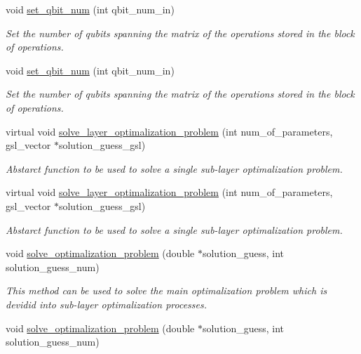 \begin{DoxyCompactItemize}
void \hyperlink{class_operation__block_acc41ac933723558df3f4e65ae1158091}{set\+\_\+qbit\+\_\+num} (int qbit\+\_\+num\+\_\+in)
\begin{DoxyCompactList}\small\item\em Set the number of qubits spanning the matrix of the operations stored in the block of operations. \end{DoxyCompactList}\item 
void \hyperlink{class_operation__block_acc41ac933723558df3f4e65ae1158091}{set\+\_\+qbit\+\_\+num} (int qbit\+\_\+num\+\_\+in)
\begin{DoxyCompactList}\small\item\em Set the number of qubits spanning the matrix of the operations stored in the block of operations. \end{DoxyCompactList}\item 
virtual void \hyperlink{class_decomposition___base_acd8a90c71e28ddac71d0941b7d00acb7}{solve\+\_\+layer\+\_\+optimalization\+\_\+problem} (int num\+\_\+of\+\_\+parameters, gsl\+\_\+vector $\ast$solution\+\_\+guess\+\_\+gsl)
\begin{DoxyCompactList}\small\item\em Abstarct function to be used to solve a single sub-\/layer optimalization problem. \end{DoxyCompactList}\item 
virtual void \hyperlink{class_decomposition___base_af9e43f240238e3327e2701555a174ee4}{solve\+\_\+layer\+\_\+optimalization\+\_\+problem} (int num\+\_\+of\+\_\+parameters, gsl\+\_\+vector $\ast$solution\+\_\+guess\+\_\+gsl)
\begin{DoxyCompactList}\small\item\em Abstarct function to be used to solve a single sub-\/layer optimalization problem. \end{DoxyCompactList}\item 
void \hyperlink{class_decomposition___base_ae21ecd8c5016a6ec942330247e8cdebc}{solve\+\_\+optimalization\+\_\+problem} (double $\ast$solution\+\_\+guess, int solution\+\_\+guess\+\_\+num)
\begin{DoxyCompactList}\small\item\em This method can be used to solve the main optimalization problem which is devidid into sub-\/layer optimalization processes. \end{DoxyCompactList}\item 
void \hyperlink{class_decomposition___base_ae21ecd8c5016a6ec942330247e8cdebc}{solve\+\_\+optimalization\+\_\+problem} (double $\ast$solution\+\_\+guess, int solution\+\_\+guess\+\_\+num)

\end{DoxyCompactItemize}
